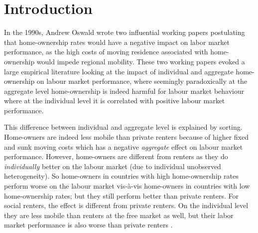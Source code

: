\documentclass[fleqn,10pt]{SelfArx} %
\affiliation{\textsuperscript{1}\textit{Department of Spatial Economics, Vrije Universiteit Amsterdam, Amsterdam, The Netherlands}} %
\affiliation{*\textbf{Corresponding author}: \Letter{} t.de.graaff@vu.n; \Mundus{} \href{thomasdegraaff.nl}{thomasdegraaff.nl}} %
\begin{document}
	
	\flushbottom %
	\maketitle %
	\thispagestyle{empty} %
	
	
	\section{Introduction} %

        In the 1990s, Andrew Oswald wrote two influential working papers
        \citep{oswald1996conjecture, oswald1999housing} postulating
        that home-ownership rates would have a negative impact on labor
        market performance, as the high costs of moving residence
        associated with home-ownership would impede regional
        mobility. These two working papers evoked a large empirical
        literature \citep[see, e.g., ][]{munch2006homeowners,
          munch2008home, de2013european} looking at the impact of
        individual and aggregate home-ownership on labour market
        performance, where seemingly paradoxically at the aggregate
        level home-ownership is indeed harmful for labour market
        behaviour where at the individual level it is correlated with
        positive labour market performance.
        
        This difference between individual and aggregate level is explained by
        sorting. Home-owners are indeed less mobile than private renters
        because of higher fixed and sunk moving costs which has a
        negative \emph{aggregate} effect on labour market
        performance. However, home-owners are different from renters
        as they do \emph{individually} better on the labour market (due to
        individual unobserved heterogeneity). So home-owners in countries with high home-ownership rates perform worse on the labour market vis-\`a-vis home-owners in countries with low home-ownership rates; but they still perform better than private renters. For social renters, the effect is different from private renters. On the individual level they are less mobile than renters at the free market as well, but their labor market performance is also worse than private renters \citep{hughes1981council, de2009homeownership}.
        
\end{document}
